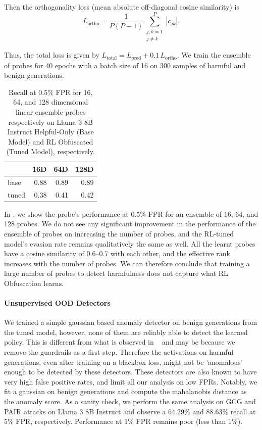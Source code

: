 Then the orthogonality loss (mean absolute off-diagonal cosine similarity) is
\[
L_{\text{ortho}}
= \frac{1}{P(P-1)} \sum_{\substack{j,k=1 \\ j \ne k}}^P |c_{jk}|.
\]

Thus, the total loss is given by $L_{\text{total}} = L_{\text{pred}} + 0.1\, L_{\text{ortho}}$. We train the ensemble of probes for 40 epochs with a batch size of 16 on 300 samples of harmful and benign generations. 

\begin{table}
    \vspace{-10pt}
    \centering
    \begin{tabular}{lrrr}
        \toprule
         & 16D & 64D & 128D \\
        \midrule
        base & 0.88 & 0.89 & 0.89 \\
        tuned & 0.38 & 0.41 & 0.42 \\
        \bottomrule
    \end{tabular}
    \caption{Recall at $0.5\%$ FPR for 16, 64, and 128 dimensional linear ensemble probes respectively on Llama 3 8B Instruct Helpful-Only (Base Model) and RL Obfuscated (Tuned Model), respectively.}
    \label{tab:ensemble_probe_scores}
    \vspace{-25pt}
\end{table}

In , we show the probe's performance at $0.5\%$ FPR for an ensemble of 16, 64, and 128 probes.
We do not see any significant improvement in the performance of the ensemble of probes on increasing the number of probes, and the RL-tuned model's evasion rate remains qualitatively the same as well.
All the learnt probes have a cosine similarity of 0.6--0.7 with each other, and the effective rank increases with the number of probes.
We can therefore conclude that training a large number of probes to detect harmfulness does not capture what RL Obfuscation learns.


\paragraph{Unsupervised OOD Detectors} 

We trained a simple gaussian based anomaly detector on benign generations from the tuned model, however, none of them are reliably able to detect the learned policy. This is different from what is observed in ~\citet{bailey2024obfuscated} and may be because we remove the guardrails as a first step. Therefore the activations on harmful generations, even after training on a blackbox loss, might not be 'anomalous' enough to be detected by these detectors. These detectors are also known to have very high false positive rates, and limit all our analysis on low FPRs. Notably, we fit a gaussian on benign generations and compute the mahalanobis distance as the anomaly score. As a sanity check, we perform the same analysis on GCG and PAIR attacks on Llama 3 8B Instruct and observe a $64.29\%$ and $88.63\%$ recall at $5\%$ FPR, respectively. Performance at $1\%$ FPR remains poor (less than $1\%$). 

